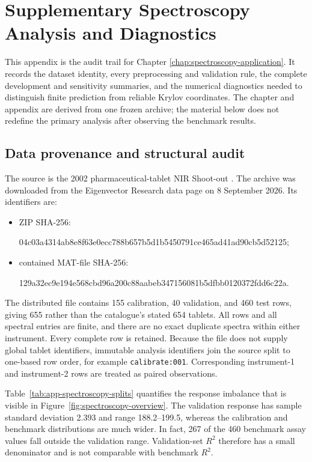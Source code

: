 \chapter{Supplementary Spectroscopy Analysis and Diagnostics}
\label{app:spectroscopy-supplement}

This appendix is the audit trail for Chapter
\ref{chap:spectroscopy-application}.  It records the dataset identity, every
preprocessing and validation rule, the complete development and sensitivity
summaries, and the numerical diagnostics needed to distinguish finite
prediction from reliable Krylov coordinates.  The chapter and appendix are
derived from one frozen archive; the material below does not redefine the
primary analysis after observing the benchmark results.

\section{Data provenance and structural audit}
\label{sec:app-spectroscopy-provenance}

The source is the 2002 pharmaceutical-tablet NIR Shoot-out
\parencite{hopkins_2003,eigenvector_tablets}.  The archive was downloaded from
the Eigenvector Research data page on 8 September 2026.  Its identifiers are:
\begin{itemize}
    \item ZIP SHA-256:\par
    {\footnotesize\ttfamily
    04c03a4314ab8e8f63e0ecc788b657b5d1b5450791ce465ad41ad90cb5d52125};
    \item contained MAT-file SHA-256:\par
    {\footnotesize\ttfamily
    129a32ec9e194e568cbd96a200c88aabeb347156081b5dfbb0120372fdd6c22a}.
\end{itemize}
The distributed file contains 155 calibration, 40 validation, and 460 test
rows, giving 655 rather than the catalogue's stated 654 tablets.  All rows and
all spectral entries are finite, and there are no exact duplicate spectra
within either instrument.  Every complete row is retained.  Because the file
does not supply global tablet identifiers, immutable analysis identifiers join
the source split to one-based row order, for example
\texttt{calibrate:001}.  Corresponding instrument-1 and instrument-2 rows are
treated as paired observations.

Table~\ref{tab:app-spectroscopy-splits} quantifies the response imbalance that
is visible in Figure~\ref{fig:spectroscopy-overview}.  The validation response
has sample standard deviation 2.393 and range 188.2--199.5, whereas the
calibration and benchmark distributions are much wider.  In fact, 267 of the
460 benchmark assay values fall outside the validation range.  Validation-set
$R^2$ therefore has a small denominator and is not comparable with benchmark
$R^2$.

